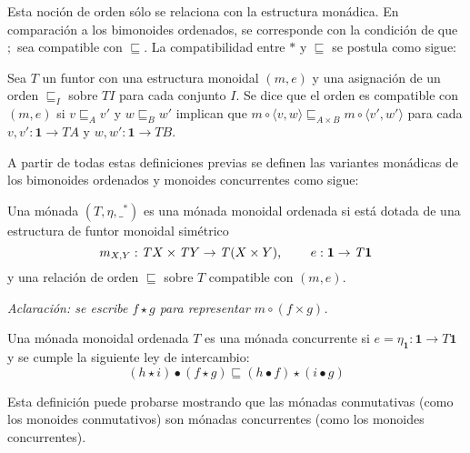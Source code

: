 Esta noción de orden sólo se relaciona con la estructura monádica. En comparación a los bimonoides ordenados, se corresponde con la condición de que $;$ sea compatible con $\sqsubseteq$. La compatibilidad entre $*$ y $\sqsubseteq$ se postula como sigue:

\begin{definition}
Sea $\mathit{T}$ un funtor con una estructura monoidal $(m,e)$ y una asignación de un orden $\sqsubseteq_I$ sobre $\mathit{T} I$ para cada conjunto $I$. Se dice que el orden es compatible con $(m,e)$ si $v \sqsubseteq_A v'$ y $w \sqsubseteq_B w'$ implican que $m \circ \langle v,w \rangle \sqsubseteq_{A \times B} m \circ \langle v',w' \rangle$ para cada $v,v' : \mathbf{1} \rightarrow \mathit{T} A$ y $w,w' : \mathbf{1} \rightarrow \mathit{T} B$. 
\end{definition}

A partir de todas estas definiciones previas se definen las variantes monádicas de los bimonoides ordenados y monoides concurrentes como sigue:

\begin{definition}
Una mónada $(\mathit{T},\eta,\_^*)$ es una mónada monoidal ordenada si está dotada de una estructura de funtor monoidal simétrico 
\begin{equation*}
m_{X,Y} : \mathit{T} X \times \mathit{T} Y \rightarrow \mathit{T} (X \times Y) \text{, \qquad} e : \mathbf{1} \rightarrow \mathit{T} \mathbf{1} 
\end{equation*}
y una relación de orden $\sqsubseteq$ sobre $\mathit{T}$ compatible con $(m,e)$.
\end{definition}

\textit{Aclaración: se escribe $f \star g$ para representar $m \circ (f \times g)$.}

\begin{definition}\label{def:monconc}
Una mónada monoidal ordenada $\mathit{T}$ es una mónada concurrente si $e = \eta_{\mathbf{1}} : \mathbf{1} \rightarrow \mathit{T} \mathbf{1}$ y se cumple la siguiente ley de intercambio:
\begin{equation*}
(h \star i) \bullet (f \star g) \sqsubseteq (h \bullet f) \star (i \bullet g)
\end{equation*}
\end{definition}

Esta definición puede probarse mostrando que las mónadas conmutativas (como los monoides conmutativos) son mónadas concurrentes (como los monoides concurrentes). 

